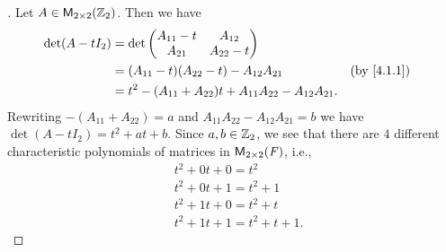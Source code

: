 \begin{proof}[]
	Let \(A \in \mathsf{M}_{{2} \times 2}({\mathbb{Z}_2})\).
	Then we have
	\begin{align*}
		\det(A - t I_2) & = \det\begin{pmatrix}
			                        A_{1 1} - t & A_{1 2}     \\
			                        A_{2 1}     & A_{2 2} - t
		                        \end{pmatrix}                                                    \\
		                & = (A_{1 1} - t) (A_{2 2} - t) - A_{1 2} A_{2 1}                    &  & \by{4.1.1} \\
		                & = t^2 - (A_{1 1} + A_{2 2}) t + A_{1 1} A_{2 2} - A_{1 2} A_{2 1}.
	\end{align*}
	Rewriting \(-(A_{1 1} + A_{2 2}) = a\) and \(A_{1 1} A_{2 2} - A_{1 2} A_{2 1} = b\) we have \(\det(A - t I_2) = t^2 + at + b\).
	Since \(a, b \in \mathbb{Z}_2\), we see that there are \(4\) different characteristic polynomials of matrices in \(\mathsf{M}_{{2} \times 2}({\mathit{F}})\), i.e.,
	\begin{align*}
		 & t^2 + 0t + 0 = t^2          \\
		 & t^2 + 0t + 1 = t^2 + 1      \\
		 & t^2 + 1t + 0 = t^2 + t      \\
		 & t^2 + 1t + 1 = t^2 + t + 1.
	\end{align*}
\end{proof}

